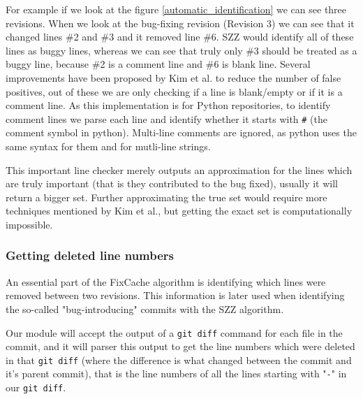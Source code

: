 \documentclass[12pt,twoside,notitlepage]{report}
\newcommand{\fxch}{FixCache}
\begin{document}
For example if we look at the figure \ref{automatic_identification} we can see three revisions. When we look at the bug-fixing revision (Revision 3) we can see that it changed lines \#2 and \#3 and it removed line \#6.
SZZ would identify all of these lines as buggy lines, whereas we can see that truly only \#3 should be treated as a buggy line, because \#2 is a comment line and \#6 is blank line.
Several improvements have been proposed by Kim et al. to reduce the number of false positives\cite{KimZim}, out of these we are only checking if a line is blank/empty or if it is a comment line. As this implementation is for Python repositories, to identify comment lines we parse each line and identify whether it starts with \texttt{\#} (the comment symbol in python). Multi-line comments are ignored, as python uses the same syntax for them and for mutli-line strings. 

This important line checker merely outputs an approximation for the lines which are truly important (that is they contributed to the bug fixed), usually it will return a bigger set. Further approximating the true set would require more techniques mentioned by Kim et al., but getting the exact set is computationally impossible\cite{KimZim}. 
\subsubsection*{Getting deleted line numbers}
An essential part of the \fxch{} algorithm is identifying which lines were removed between two revisions. This information is later used when identifying the so-called "bug-introducing" commits with the SZZ algorithm.

Our module will accept the output of a \texttt{git diff} command for each file in the commit, and it will parser this output to get the line numbers which were deleted in that \texttt{git diff} (where the difference is what changed between the commit and it's parent commit), that is the line numbers of all the lines starting with "\texttt{-}" in our \texttt{git diff}.
\end{document}
